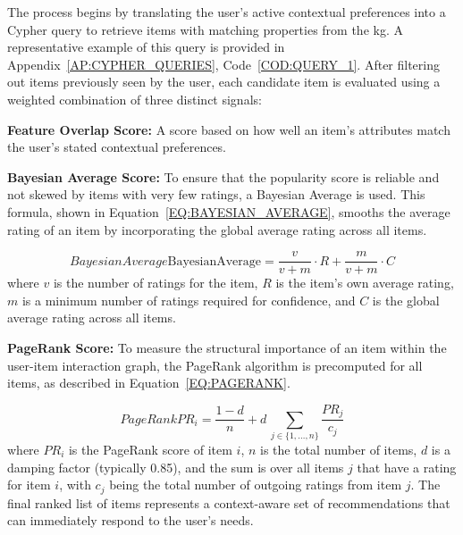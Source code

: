 The process begins by translating the user's active contextual preferences into a Cypher query to retrieve items with matching properties from the \ac{kg}. A representative example of this query is provided in Appendix~\ref{AP:CYPHER_QUERIES}, Code~\ref{COD:QUERY_1}. After filtering out items previously seen by the user, each candidate item is evaluated using a weighted combination of three distinct signals:
\begin{compactitem}[\textbullet]
    \item \textbf{Feature Overlap Score:} A score based on how well an item's attributes match the user's stated contextual preferences.
    \item \textbf{Bayesian Average Score:} To ensure that the popularity score is reliable and not skewed by items with very few ratings, a Bayesian Average is used. This formula, shown in Equation~\ref{EQ:BAYESIAN_AVERAGE}, smooths the average rating of an item by incorporating the global average rating across all items.
    
    \vspace{5pt}
    \begin{equation}[EQ:BAYESIAN_AVERAGE]{Bayesian Average}
        \text{BayesianAverage} = \frac{v}{v+m} \cdot R + \frac{m}{v+m} \cdot C
    \end{equation}
    \noindent where $v$ is the number of ratings for the item, $R$ is the item's own average rating, $m$ is a minimum number of ratings required for confidence, and $C$ is the global average rating across all items.

    \item \textbf{PageRank Score:} To measure the structural importance of an item within the user-item interaction graph, the PageRank algorithm \cite{PAGERANK} is precomputed for all items, as described in Equation~\ref{EQ:PAGERANK}.

    \vspace{5pt}
    \begin{equation}[EQ:PAGERANK]{PageRank}
        PR_{i}={\frac  {1-d}{n}}+d\,\sum _{{j\in \{1,\dots ,n\}}}{\frac  {PR_{j}}{c_{j}}}
    \end{equation}
    \noindent where $PR_i$ is the PageRank score of item $i$, $n$ is the total number of items, $d$ is a damping factor (typically 0.85), and the sum is over all items $j$ that have a rating for item $i$, with $c_j$ being the total number of outgoing ratings from item $j$. The final ranked list of items represents a context-aware set of recommendations that can immediately respond to the user's needs.
\end{compactitem}

